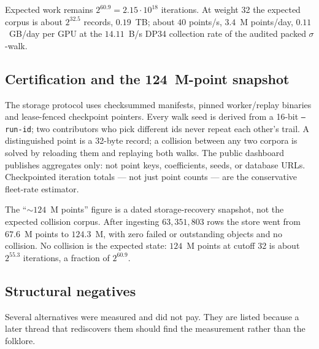 Expected work remains $2^{60.9}=2.15\cdot 10^{18}$ iterations. At
weight 32 the expected corpus is about $2^{32.5}$ records, $0.19$~TB;
about $40$ points/s, $3.4$~M points/day, $0.11$~GB/day per GPU at the
$14.11$~B/s DP34 collection rate of the audited packed
$\sigma$-walk.

\subsection{Certification and the 124~M-point snapshot}

The storage protocol uses checksummed manifests, pinned
worker/replay binaries and lease-fenced checkpoint pointers. Every
walk seed is derived from a 16-bit \texttt{--run-id}; two contributors
who pick different ids never repeat each other's trail. A distinguished
point is a 32-byte record; a collision between any two corpora is
solved by reloading them and replaying both walks. The public
dashboard publishes aggregates only: not point keys, coefficients,
seeds, or database URLs. Checkpointed iteration totals --- not just
point counts --- are the conservative fleet-rate estimator.

The ``$\sim 124$~M points'' figure is a dated storage-recovery
snapshot, not the expected collision corpus. After ingesting
$63{,}351{,}803$ rows the store went from $67.6$~M points to
$124.3$~M, with zero failed or outstanding objects and no
collision.
No collision is the expected state: $124$~M points at cutoff 32 is
about $2^{55.3}$ iterations, a fraction of $2^{60.9}$.

\subsection{Structural negatives}

Several alternatives were measured and did not pay. They are listed
because a later thread that rediscovers them should find the
measurement rather than the folklore.

